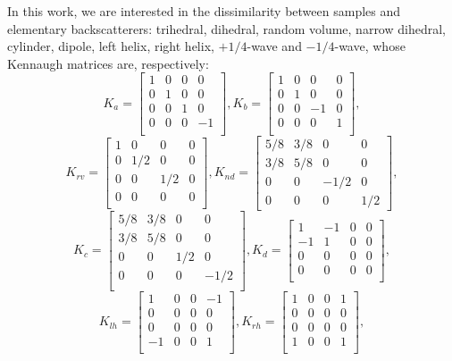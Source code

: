 \documentclass[conference]{IEEEtran}
\begin{document}
In this work, we are interested in the dissimilarity between samples and elementary backscatterers:
trihedral, dihedral, random volume, narrow dihedral, cylinder, dipole, left helix, right helix, $+1/4$-wave and $-1/4$-wave, whose Kennaugh matrices are, respectively:
\[K_a =
\begin{bmatrix}
1 & 0 & 0 & 0\\
0 & 1 & 0 & 0\\
0 & 0 & 1 & 0\\
0 & 0 & 0 & -1\\
\end{bmatrix},
K_b =
\begin{bmatrix}
1 & 0 & 0 & 0\\
0 & 1 & 0 & 0\\
0 & 0 & -1 & 0\\
0 & 0 & 0 & 1\\
\end{bmatrix},
\]
\[K_{rv} =
\begin{bmatrix}
1 & 0 & 0 & 0\\
0 & 1/2 & 0 & 0\\
0 & 0 & 1/2 & 0\\
0 & 0 & 0 & 0\\
\end{bmatrix},
K_{nd} =
\begin{bmatrix}
5/8 & 3/8 & 0 & 0\\
3/8 & 5/8 & 0 & 0\\
0 & 0 & -1/2 & 0\\
0 & 0 & 0 & 1/2
\end{bmatrix},
\]
\[K_{c} =
\begin{bmatrix}
5/8 & 3/8 & 0 & 0\\
3/8 & 5/8 & 0 & 0\\
0 & 0 & 1/2 & 0\\
0 & 0 & 0 & -1/2\\
\end{bmatrix},
K_d=
\begin{bmatrix}
1 & -1 & 0 & 0\\
-1 & 1 & 0 & 0\\
0 & 0 & 0 & 0\\
0 & 0 & 0 & 0\\
\end{bmatrix},
\]
\[K_{lh}=
\begin{bmatrix}
1 & 0 & 0 & -1\\
0 & 0 & 0 & 0\\
0 & 0 & 0 & 0\\
-1 & 0 & 0 & 1\\
\end{bmatrix},
K_{rh}=
\begin{bmatrix}
1 & 0 & 0 & 1\\
0 & 0 & 0 & 0\\
0 & 0 & 0 & 0\\
1 & 0 & 0 & 1\\
\end{bmatrix}
,\]
\end{document}

